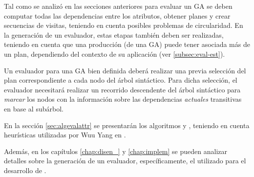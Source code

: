 Tal como se analizó en las secciones anteriores para evaluar un GA se deben computar todas las dependencias entre los atributos, obtener planes y crear secuencias de visitas, teniendo en cuenta posibles problemas de circularidad. En la generación de un evaluador, estas etapas también deben ser realizadas, teniendo en cuenta que una producción (de una GA) puede tener asociada más de un plan, dependiendo del contexto de su aplicación (ver \ref{subsec:eval-est}). 

Un evaluador para una GA bien definida deberá realizar una previa selección del plan correspondiente a cada nodo del árbol sintáctico. Para dicha selección, el evaluador necesitará realizar un recorrido descendente del árbol sintáctico para \emph{marcar} los nodos con la información sobre las dependencias \emph{actuales} transitivas en base al subárbol.

En la sección \ref{sec:algevalattr} se presentarán los algoritmos  y , teniendo en cuenta heurísticas utilizadas por Wuu Yang en \cite{wuu-yang1}.

Además, en los capítulos \ref{chap:disen_} y \ref{chap:implem} se pueden analizar detalles sobre la generación de un evaluador, específicamente, el utilizado para el desarrollo de \maggen.
